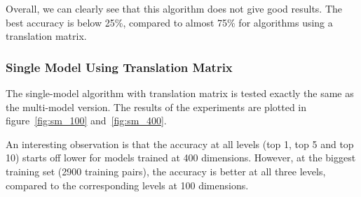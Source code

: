 Overall, we can clearly see that this algorithm does not give good results. The best accuracy is below 25\%, compared to almost 75\% for algorithms using a translation matrix.

\subsubsection{Single Model Using Translation Matrix}
The single-model algorithm with translation matrix is tested exactly the same as the multi-model version. The results of the experiments are plotted in figure~\ref{fig:sm_100} and~\ref{fig:sm_400}. 

An interesting observation is that the accuracy at all levels (top 1, top 5 and top 10) starts off lower for models trained at 400 dimensions. However, at the biggest training set (2900 training pairs), the accuracy is better at all three levels, compared to the corresponding levels at 100 dimensions.

